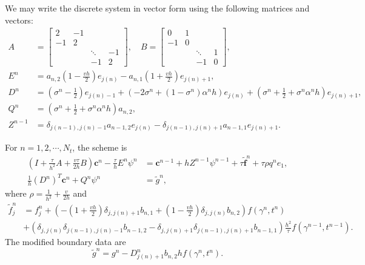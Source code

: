 \documentclass[11pt,reqno]{amsart}
\theoremstyle{plain}
\theoremstyle{definition}
\numberwithin{equation}{section}
\newcommand{\paren}[1]{\left(#1\right)}
\newcommand{\wt}[1]{\widetilde{#1}}
\newcommand{\bm}[1]{\boldsymbol{#1}}
\begin{document}
We may write the discrete system in vector form using the following matrices and vectors:
\begin{align}
    A &=
\begin{bmatrix}
2 & -1   &        &  \\
-1 & 2   &        &  \\
   &    & \ddots & -1 \\
   &       & -1 & 2
\end{bmatrix},\quad
B =
\begin{bmatrix}
0 & 1     &        &  \\
-1 & 0    &        &  \\
   &     & \ddots & 1 \\
   &       & -1 & 0
\end{bmatrix},\label{eqn:AB-mat}\\
    E^n &= a_{n,2}\paren{1-\frac{vh}{2}} e_{j(n)} -a_{n,1} \paren{1+\frac{vh}{2}} e_{j(n)+1},\\
    D^n &= \paren{\sigma^n-\frac{1}{2}}e_{j(n)-1} + \paren{-2\sigma^n+\paren{1-\sigma^n}\alpha^nh} e_{j(n)} + \paren{\sigma^n+\frac{1}{2}+\sigma^n\alpha^nh}e_{j(n)+1},\\
    Q^n &= \paren{\sigma^n+\frac{1}{2}+\sigma^n\alpha^nh} a_{n,2},\\
    Z^{n-1} &= \delta_{j(n-1), j(n)-1}a_{n-1,2}e_{j(n)} - \delta_{j(n-1),j(n)+1}a_{n-1,1}e_{j(n)+1}.
\end{align}





For $n=1,2,\cdots,N_t$, the scheme is
\begin{subequations}\label{eqn:scheme}
\begin{align}
    \paren{I + \frac{\tau}{h^2}A + \frac{v\tau}{2h}B}\bm c^n - \frac{\tau}{h}E^n \psi^n &= \bm c^{n-1} + h  Z^{n-1}\psi^{n-1} + \tau \wt{\bm f}^n + \tau\rho  q^n e_1,\\
    \frac{1}{h} (D^n)^T\bm c^n +  Q^n\psi^n &= \wt g^n,
\end{align}
\end{subequations}
where $\rho = \frac{1}{h^2}+\frac{v}{2h}$ and
\begin{equation}
\begin{aligned}
\wt f_j^n
    &= f_j^n + \paren{ - \paren{1+\frac{vh}{2}}\delta_{j, j(n)+1}  b_{n,1}  + \paren{1-\frac{vh}{2}} \delta_{j, j(n)} b_{n,2}} f(\gamma^n,t^n) \\
    &+ \paren{\delta_{j,j(n)} \delta_{j(n-1), j(n)-1}b_{n-1,2}   - \delta_{j,j(n)+1}\delta_{j(n-1),j(n)+1}b_{n-1,1} }\frac{h^2}{\tau}f(\gamma^{n-1},t^{n-1}).
\end{aligned}
\end{equation}
The modified boundary data are
\begin{equation}
    \wt g^n = g^n - D^n_{j(n)+1} b_{n,2}hf(\gamma^n,t^n).
\end{equation}
\end{document}
